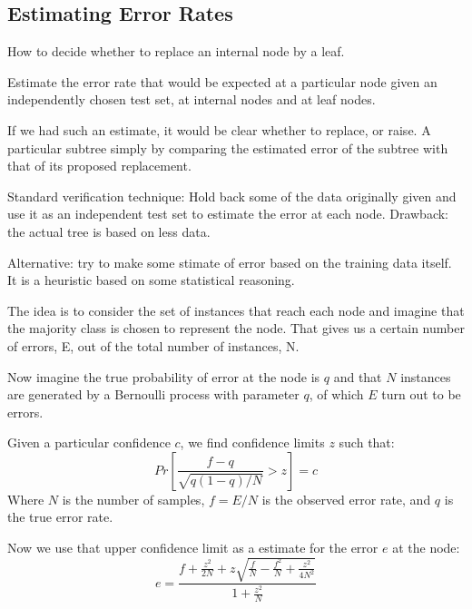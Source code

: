\subsection{Estimating Error Rates}
How to decide whether to replace an internal node by a leaf.

Estimate the error rate that would be expected at a particular node given
an independently chosen test set, at internal nodes and at leaf nodes.

If we had such an estimate, it would be clear whether to replace, or
raise. A particular subtree simply by comparing the estimated error of the
subtree with that of its proposed replacement.

Standard verification technique: Hold back some of the data originally
given and use it as an independent test set to estimate the error at each
node. Drawback: the actual tree is based on less data.

Alternative: try to make some stimate of error based on the training data
itself. It is a heuristic based on some statistical reasoning.

The idea is to consider the set of instances that reach each node and
imagine that the majority class is chosen to represent the node. That
gives us a certain number of errors, E, out of the total number of
instances, N.

Now imagine the true probability of error at the node is $q$ and that $N$
instances are generated by a Bernoulli process with parameter $q$, of
which $E$ turn out to be errors.

Given a particular confidence $c$, we find confidence limits $z$ such
that:
\[ 
    Pr\left[ \frac{f-q}{\sqrt{q(1-q)/N}} > z \right] = c
\]
Where $N$ is the number of samples, $f = E/N$ is the observed error rate,
and $q$ is the true error rate.

Now we use that upper confidence limit as a estimate for the error $e$ at
the node:
\[
    e = \frac{f+\frac{z^2}{2N}+z\sqrt{\frac{f}{N} -
    \frac{f^2}{N}+\frac{z^2}{4N^2}}}{1+\frac{z^2}{N}}
\]



